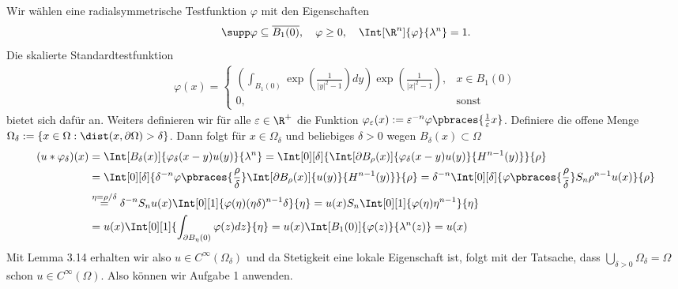 \begin{solution}
	Wir wählen eine radialsymmetrische Testfunktion $\varphi$ mit den Eigenschaften
	\begin{align*}
	\supp \varphi \subseteq \overline{B_1(0)}, \quad \varphi \geq 0, \quad \Int[\R^n]{\varphi}{\lambda^n} = 1.
	\end{align*}
	Die skalierte Standardtestfunktion
  \begin{align*}
    \varphi(x) = \begin{cases}
      \left(\int_{B_1(0)}\exp\left(\frac{1}{|y|^2-1}\right) dy\right)
      \exp\left(\frac{1}{|x|^2-1}\right), & x \in B_1(0) \\
      0, & \text{sonst}
    \end{cases}
  \end{align*} bietet sich dafür an. Weiters definieren wir für alle $\varepsilon \in \R^+$ die Funktion $\varphi_\varepsilon (x) := \varepsilon^{-n} \varphi\pbraces{\frac{1}{\varepsilon}x}$.
  Definiere die offene Menge $\Omega_{\delta} := \{x \in \Omega: \dist(x,\partial\Omega) > \delta\}$.
  Dann folgt für $x \in \Omega_{\delta}$ und beliebiges $\delta > 0$ wegen $B_{\delta}(x) \subset \Omega$
	\begin{align*}
	(u \ast \varphi_\delta)(x) &= \Int[B_\delta(x)]{\varphi_\delta(x - y) u(y) }{\lambda^n}
  = \Int[0][\delta]{\Int[\partial B_\rho(x)]{\varphi_\delta(x - y) u(y) }{H^{n-1}(y)}}{\rho} \\
	 &= \Int[0][\delta]{\delta^{-n} \varphi\pbraces{\frac{\rho}{\delta}}
   \Int[\partial B_\rho(x)]{ u(y) }{H^{n-1}(y)}}{\rho} = \delta^{-n}
   \Int[0][\delta]{\varphi\pbraces{\frac{\rho}{\delta}}S_n \rho^{n-1} u(x)}{\rho} \\
	 &\stackrel{\eta = \rho/\delta}{=} \delta^{-n} S_n u(x) \Int[0][1]{\varphi(\eta) (\eta \delta)^{n-1} \delta }{\eta}
   = u(x) S_n  \Int[0][1]{\varphi(\eta) \eta^{n-1}  }{\eta} \\
	 &= u(x) \Int[0][1]{\int_{\partial B_{\eta}(0)}\varphi(z)  dz}{\eta}
   = u(x) \Int[B_1(0)]{\varphi(z)}{\lambda^n(z)} = u(x)
	\end{align*}
  Mit Lemma 3.14 erhalten wir also $u \in C^{\infty}(\Omega_{\delta})$
  und da Stetigkeit eine lokale Eigenschaft ist, folgt mit der Tatsache, dass
  $\bigcup_{\delta > 0}\Omega_\delta = \Omega$ schon $u \in C^{\infty}(\Omega)$.
  Also können wir Aufgabe 1 anwenden.
\end{solution}

